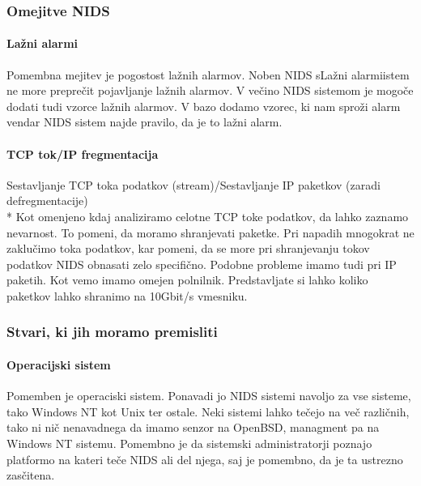 \documentclass[12pt]{article}
\begin{document}

\subsubsection{Omejitve NIDS} %

\paragraph{Lažni alarmi} %
Pomembna mejitev je pogostost lažnih alarmov.
Noben NIDS sLažni alarmiistem ne more preprečit pojavljanje lažnih alarmov.
V večino NIDS sistemom je mogoče dodati tudi vzorce lažnih alarmov. 
V bazo dodamo vzorec, ki nam sproži alarm vendar NIDS sistem najde pravilo, da je to lažni alarm.

\paragraph{TCP tok/IP fregmentacija} %

Sestavljanje TCP toka podatkov (stream)/Sestavljanje IP paketkov (zaradi defregmentacije)
\\*
Kot omenjeno kdaj analiziramo celotne TCP toke podatkov, da lahko zaznamo nevarnost. To pomeni, da moramo shranjevati paketke. 
Pri napadih mnogokrat ne zaklučimo toka podatkov, kar pomeni, da se more pri shranjevanju tokov podatkov NIDS obnasati zelo specifično. Podobne probleme imamo tudi pri IP paketih. 
Kot vemo imamo omejen polnilnik. Predstavljate si lahko koliko paketkov lahko shranimo na 10Gbit/s vmesniku.


\subsubsection{Stvari, ki jih moramo premisliti} %

\paragraph{Operacijski sistem} %

Pomemben je operaciski sistem. Ponavadi jo NIDS sistemi navoljo za vse sisteme,
tako Windows NT kot Unix ter ostale. Neki sistemi lahko tečejo na več različnih, tako ni nič nenavadnega
da imamo senzor na OpenBSD, managment pa na Windows NT sistemu.
Pomembno je da sistemski administratorji poznajo platformo na kateri teče NIDS ali del njega, saj je pomembno, da je ta ustrezno zasčitena.
\end{document}
